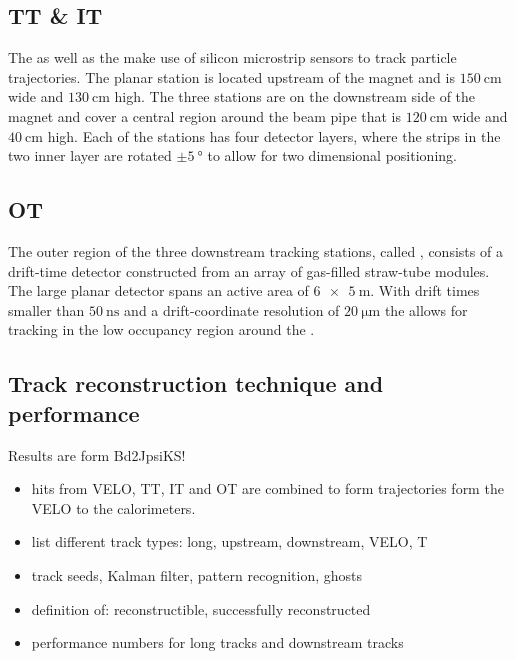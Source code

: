 \subsection{TT \& IT}
\label{sec:lhcb_experiment:tracking:ttit}

The \TT as well as the \IT make use of silicon microstrip sensors to track
particle trajectories. The planar \TT station is located upstream of the magnet
and is $\SI{150}{\centi\metre}$ wide and $\SI{130}{\centi\metre}$ high. The
three \IT stations are on the downstream side of the magnet and cover a central
region around the beam pipe that is $\SI{120}{\centi\metre}$ wide and
$\SI{40}{\centi\metre}$ high. Each of the stations has four detector layers,
where the strips in the two inner layer are rotated $\pm\SI{5}{\degree}$ to
allow for two dimensional positioning.

\subsection{OT}
\label{sec:lhcb_experiment:tracking:ot}

The outer region of the three downstream tracking stations, called \OT, consists
of a drift-time detector constructed from an array of gas-filled straw-tube
modules. The large planar detector spans an active area of $\SI[product-units =
power]{6 x 5}{\metre}$. With drift times smaller than $\SI{50}{\nano\second}$
and a drift-coordinate resolution of $\SI{20}{\micro\metre}$ the \OT allows for
tracking in the low occupancy region around the \IT.

\subsection{Track reconstruction technique and performance}
\label{sec:lhcb_experiment:tracking:techniques_and_performance}
Results are form Bd2JpsiKS!
\begin{itemize}
  \item hits from VELO, TT, IT and OT are combined to form trajectories form the VELO to the calorimeters. 
  \item list different track types: long, upstream, downstream, VELO, T
  \item track seeds, Kalman filter, pattern recognition, ghosts
  \item definition of: reconstructible, successfully reconstructed
  \item performance numbers for long tracks and downstream tracks
\end{itemize}

